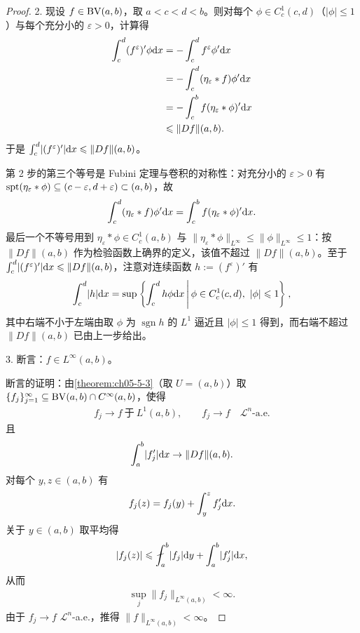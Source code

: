 \documentclass[../../main.tex]{subfiles}%
\begin{document}
\begin{proof}
2. 现设 $f\in\mathrm{BV}(a,b)$，取 $a<c<d<b$。则对每个 $\phi\in C_c^1(c,d)$（$\lvert\phi\rvert\leqslant1$）与每个充分小的 $\varepsilon>0$，计算得
\begin{align*}
\int_c^d(f^\varepsilon)'\phi\mathrm{d} x&=-\int_c^d f^\varepsilon\phi'\mathrm{d} x\\
&=-\int_c^d(\eta_\varepsilon*f)\phi'\mathrm{d} x\\
&=-\int_c^b f(\eta_\varepsilon*\phi)'\mathrm{d} x\\
&\leqslant\lVert Df\rVert(a,b).
\end{align*}
于是 $\int_c^d\lvert(f^\varepsilon)'\rvert\mathrm{d} x\leqslant\lVert Df\rVert(a,b)$。

第 2 步的第三个等号是 Fubini 定理与卷积的对称性：对充分小的 $\varepsilon>0$ 有 $\operatorname{spt}(\eta_\varepsilon*\phi)\subseteq(c-\varepsilon,d+\varepsilon)\subset(a,b)$，故
\begin{align*}
\int_c^d(\eta_\varepsilon*f)\phi'\mathrm{d} x=\int_c^b f(\eta_\varepsilon*\phi)'\mathrm{d} x .
\end{align*}
最后一个不等号用到 $\eta_\varepsilon*\phi\in C_c^1(a,b)$ 与 $\lVert\eta_\varepsilon*\phi\rVert_{L^\infty}\leqslant\lVert\phi\rVert_{L^\infty}\leqslant1$：按 $\lVert Df\rVert(a,b)$ 作为检验函数上确界的定义，该值不超过 $\lVert Df\rVert(a,b)$。至于 $\int_c^d\lvert(f^\varepsilon)'\rvert\mathrm{d} x\leqslant\lVert Df\rVert(a,b)$，注意对连续函数 $h:=(f^\varepsilon)'$ 有
\begin{align*}
\int_c^d\lvert h\rvert\mathrm{d} x=\sup\left\{\int_c^d h\phi\mathrm{d} x\,\middle|\,\phi\in C_c^1(c,d),\ \lvert\phi\rvert\leqslant1\right\},
\end{align*}
其中右端不小于左端由取 $\phi$ 为 $\operatorname{sgn}h$ 的 $L^1$ 逼近且 $\lvert\phi\rvert\leqslant1$ 得到，而右端不超过 $\lVert Df\rVert(a,b)$ 已由上一步给出。

3. 断言：$f\in L^\infty(a,b)$。

断言的证明：由\cref{theorem:ch05-5-3}（取 $U=(a,b)$）取 $\{f_j\}_{j=1}^{\infty}\subseteq\mathrm{BV}(a,b)\cap C^\infty(a,b)$，使得 %
\begin{align*}
f_j\to f\ \text{于}\ L^1(a,b),\qquad f_j\to f\quad\mathcal{L}^n\text{-a.e.}
\end{align*}
且
\begin{align*}
\int_a^b\lvert f_j'\rvert\mathrm{d} x\to\lVert Df\rVert(a,b).
\end{align*}
对每个 $y,z\in(a,b)$ 有
\begin{align*}
f_j(z)=f_j(y)+\int_y^z f_j'\mathrm{d} x .
\end{align*}
关于 $y\in(a,b)$ 取平均得
\begin{align*}
\lvert f_j(z)\rvert\leqslant\fint_a^b\lvert f_j\rvert\diff y+\int_a^b\lvert f_j'\rvert\diff x,
\end{align*}
从而
\begin{align*}
\sup_j\lVert f_j\rVert_{L^\infty(a,b)}<\infty .
\end{align*}
由于 $f_j\to f$ $\mathcal{L}^n$-a.e.，推得 $\lVert f\rVert_{L^\infty(a,b)}<\infty$。


\end{proof}
\end{document}
